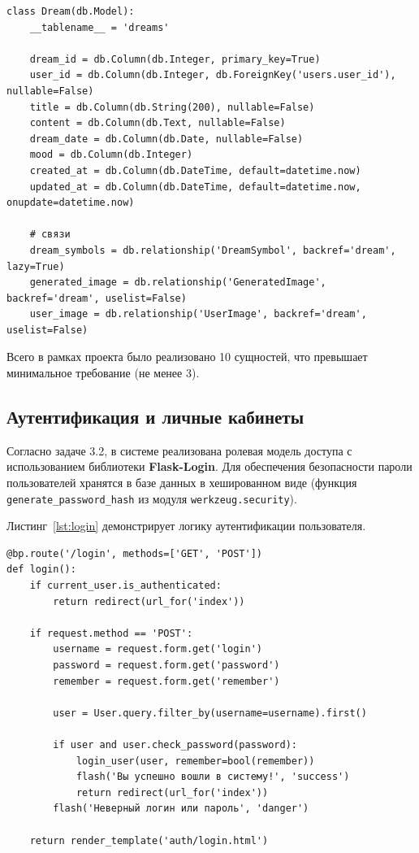 \documentclass[14pt, a4paper]{extarticle}
\begin{document}
\begin{lstlisting}[caption={Модель сна}, label={lst:dream_model}]
class Dream(db.Model):
    __tablename__ = 'dreams'

    dream_id = db.Column(db.Integer, primary_key=True)
    user_id = db.Column(db.Integer, db.ForeignKey('users.user_id'), nullable=False)
    title = db.Column(db.String(200), nullable=False)
    content = db.Column(db.Text, nullable=False)
    dream_date = db.Column(db.Date, nullable=False)
    mood = db.Column(db.Integer)
    created_at = db.Column(db.DateTime, default=datetime.now)
    updated_at = db.Column(db.DateTime, default=datetime.now, onupdate=datetime.now)

    # связи
    dream_symbols = db.relationship('DreamSymbol', backref='dream', lazy=True)
    generated_image = db.relationship('GeneratedImage', backref='dream', uselist=False)
    user_image = db.relationship('UserImage', backref='dream', uselist=False)
\end{lstlisting}

Всего в рамках проекта было реализовано 10 сущностей, что превышает минимальное требование (не менее 3).

\subsection{Аутентификация и личные кабинеты}

Согласно задаче 3.2, в системе реализована ролевая модель доступа с использованием библиотеки \textbf{Flask-Login}. Для обеспечения безопасности пароли пользователей хранятся в базе данных в хешированном виде (функция \texttt{generate\_password\_hash} из модуля \texttt{werkzeug.security}).

Листинг~\ref{lst:login} демонстрирует логику аутентификации пользователя.

\begin{lstlisting}[caption={Обработчик входа в систему}, label={lst:login}]
@bp.route('/login', methods=['GET', 'POST'])
def login():
    if current_user.is_authenticated:
        return redirect(url_for('index'))

    if request.method == 'POST':
        username = request.form.get('login')
        password = request.form.get('password')
        remember = request.form.get('remember')

        user = User.query.filter_by(username=username).first()

        if user and user.check_password(password):
            login_user(user, remember=bool(remember))
            flash('Вы успешно вошли в систему!', 'success')
            return redirect(url_for('index'))
        flash('Неверный логин или пароль', 'danger')

    return render_template('auth/login.html')
\end{lstlisting}
\end{document}
